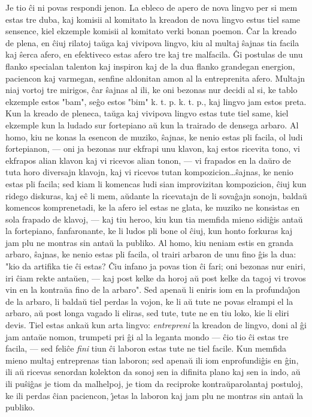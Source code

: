    Je tio \^ci ni povas respondi jenon. La ebleco de apero de nova lingvo
per si mem estas tre duba, kaj komisii al komitato la kreadon de
nova lingvo estus tiel same sensence, kiel ekzemple komisii al
komitato verki bonan poemon. \^Car la kreado de plena, en \^ciuj
rilatoj ta\u uga kaj vivipova lingvo, kiu al multaj \^sajnas tia
facila kaj \^serca afero, en efektiveco estas afero tre kaj tre
malfacila. \^Gi postulas de unu flanko specialan talenton kaj
inspiron kaj de la dua flanko grandegan energion, paciencon kaj
varmegan, senfine aldonitan amon al la entreprenita afero. Multajn
niaj vortoj tre mirigos, \^car \^sajnas al ili, ke oni bezonas nur
decidi al si, ke tablo ekzemple estos "bam", se\^go estos "bim"
k. t. p. k. t. p., kaj lingvo jam estos preta. Kun la kreado de
pleneca, ta\u uga kaj vivipova lingvo estas tute tiel same, kiel
ekzemple kun la ludado sur fortepiano a\u u kun la trairado de
densega arbaro. Al homo, kiu ne konas la esencon de muziko,
\^sajnas, ke nenio estas pli facila, ol ludi fortepianon, --- oni ja
bezonas nur ekfrapi unu klavon, kaj estos ricevita tono, vi ekfrapos
alian klavon kaj vi ricevos alian tonon, --- vi frapados en la da\u
uro de tuta horo diversajn klavojn, kaj vi ricevos tutan
kompozicion\dots \^sajnas, ke nenio estas pli facila; sed kiam li
komencas ludi sian improvizitan kompozicion, \^ciuj kun ridego
diskuras, kaj e\^c li mem, a\u udante la ricevatajn de li sova\^gajn
sonojn, balda\u u komencos komprenetadi, ke la afero iel estas ne
glata, ke muziko ne konsistas en sola frapado de klavoj, --- kaj tiu
heroo, kiu kun tia memfida mieno sidi\^gis anta\u u la fortepiano,
fanfaronante, ke li ludos pli bone ol \^ciuj, kun honto forkuras kaj
jam plu ne montras sin anta\u u la publiko. Al homo, kiu neniam
estis en granda arbaro, \^sajnas, ke nenio estas pli facila, ol
trairi arbaron de unu fino \^gis la dua: "kio da artifika tie \^ci
estas? \^Ciu infano ja povas tion \^ci fari; oni bezonas nur eniri,
iri \^ciam rekte anta\u uen, --- kaj post kelke da horoj a\u u post
kelke da tagoj vi trovos vin en la kontra\u ua fino de la arbaro".
Sed apena\u u li eniris iom en la profunda\^{\j}on de la arbaro, li
balda\u u tiel perdas la vojon, ke li a\u u tute ne povas elrampi el
la arbaro, a\u u post longa vagado li eliras, sed tute, tute ne en
tiu loko, kie li eliri devis. Tiel estas anka\u u kun arta lingvo:
{\sl entrepreni} la kreadon de lingvo, doni al \^gi jam anta\u ue
nomon, trumpeti pri \^gi al la leganta mondo --- \^cio tio \^ci
estas tre facila, --- sed feli\^ce {\sl fini} tiun \^ci laboron
estas tute ne tiel facile. Kun memfida mieno multaj entreprenas tian
laboron; sed apena\u u ili iom enprofundi\^gis en \^gin, ili a\u u
ricevas senordan kolekton da sonoj sen ia difinita plano kaj sen ia
indo, a\u u ili pu\^si\^gas je tiom da malhelpoj, je tiom da
reciproke kontra\u uparolantaj postuloj, ke ili perdas \^cian
paciencon, \^{\j}etas la laboron kaj jam plu ne montras sin anta\u u
la publiko.

